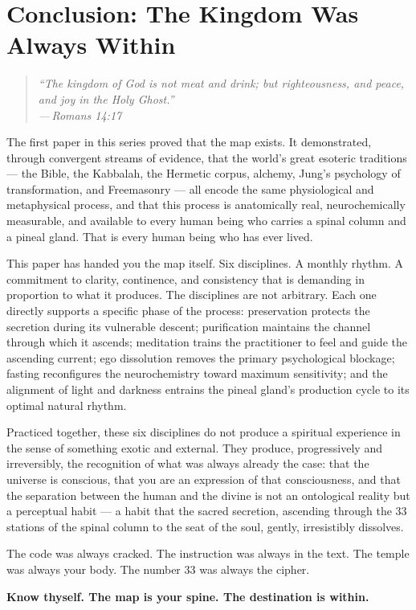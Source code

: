 \documentclass[12pt, a4paper]{article}
\newcommand{\epigraph}[2]{%
  \begin{quote}
    \itshape ``#1''\\[0.3em]
    \normalfont\small\hfill ---\,#2
  \end{quote}
}
\begin{document}
\section{Conclusion: The Kingdom Was Always Within}
\label{sec:conclusion}

\epigraph{The kingdom of God is not meat and drink; but righteousness, and
peace, and joy in the Holy Ghost.}{Romans 14:17}

The first paper in this series proved that the map exists. It demonstrated,
through convergent streams of evidence, that the world's great esoteric
traditions — the Bible, the Kabbalah, the Hermetic corpus, alchemy, Jung's
psychology of transformation, and Freemasonry — all encode the same
physiological and metaphysical process, and that this
process is anatomically real, neurochemically measurable, and available to
every human being who carries a spinal column and a pineal gland. That is
every human being who has ever lived.

This paper has handed you the map itself. Six disciplines. A monthly rhythm.
A commitment to clarity, continence, and consistency that is demanding in
proportion to what it produces. The disciplines are not arbitrary. Each one
directly supports a specific phase of the process: preservation protects the
secretion during its vulnerable descent; purification maintains the channel
through which it ascends; meditation trains the practitioner to feel and guide
the ascending current; ego dissolution removes the primary psychological
blockage; fasting reconfigures the neurochemistry toward maximum sensitivity;
and the alignment of light and darkness entrains the pineal gland's production
cycle to its optimal natural rhythm.

Practiced together, these six disciplines do not produce a spiritual experience
in the sense of something exotic and external. They produce, progressively and
irreversibly, the recognition of what was always already the case: that the
universe is conscious, that you are an expression of that consciousness, and
that the separation between the human and the divine is not an ontological
reality but a perceptual habit — a habit that the sacred secretion, ascending
through the 33 stations of the spinal column to the seat of the soul, gently,
irresistibly dissolves.

The code was always cracked. The instruction was always in the text. The temple
was always your body. The number 33 was always the cipher.

\vspace{1.5em}
\noindent\textbf{Know thyself. The map is your spine. The destination is
within.}

\newpage
\printbibliography[title={Bibliography}]
\end{document}
